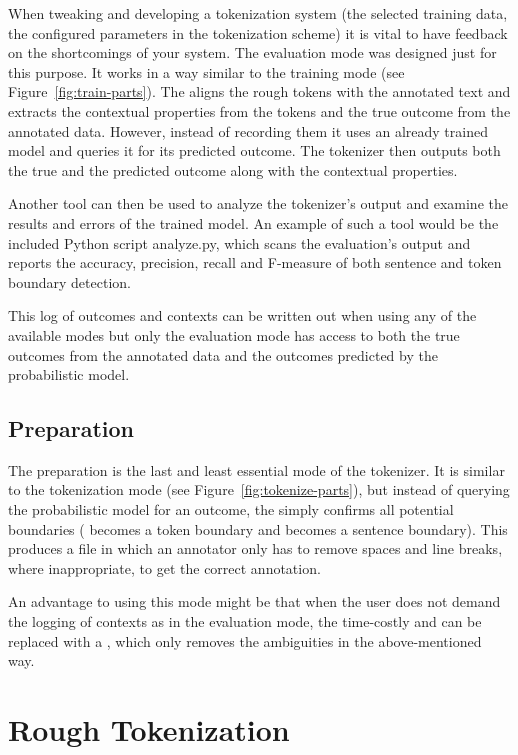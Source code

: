 When tweaking and developing a tokenization system (the selected training data,
the configured parameters in the tokenization scheme) it is vital to have
feedback on the shortcomings of your system. The evaluation mode was designed
just for this purpose. It works in a way similar to the training mode (see
Figure~\ref{fig:train-parts}). The  aligns the rough tokens
with the annotated text and extracts the contextual properties from the tokens
and the true outcome from the annotated data. However, instead of recording
them it uses an already trained model and queries it for its predicted outcome.
The tokenizer then outputs both the true and the predicted outcome along with
the contextual properties.

Another tool can then be used to analyze the tokenizer's output and examine the
results and errors of the trained model. An example of such a tool would be the
included Python script analyze.py, which scans the evaluation's output and
reports the accuracy, precision, recall and F-measure of both sentence and
token boundary detection.

This log of outcomes and contexts can be written out when using any of the
available modes but only the evaluation mode has access to both the true
outcomes from the annotated data and the outcomes predicted by the
probabilistic model.

\subsection{Preparation}
\label{ssec:impl-modes-prepare}

The preparation is the last and least essential mode of the tokenizer. It is
similar to the tokenization mode (see Figure~\ref{fig:tokenize-parts}), but
instead of querying the probabilistic model for an outcome, the
 simply confirms all potential boundaries (\maysplit{}
becomes a token boundary and \maybreaksentence{} becomes a sentence boundary).
This produces a file in which an annotator only has to remove spaces and line
breaks, where inappropriate, to get the correct annotation.

An advantage to using this mode might be that when the user does not demand the
logging of contexts as in the evaluation mode, the time-costly
 and  can be replaced with a
, which only removes the ambiguities in the
above-mentioned way.

\section{Rough Tokenization}
\label{sec:impl-roughtok}

